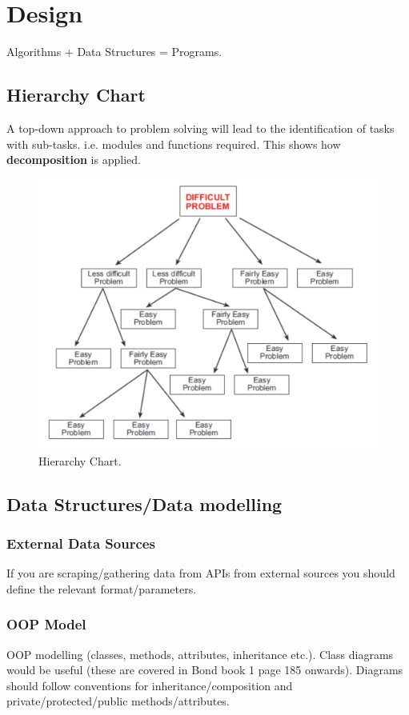 \documentclass{article}
\begin{document}
\section{Design}
Algorithms + Data Structures = Programs.

\subsection{Hierarchy Chart}
A top-down approach to problem solving will lead to the identification of tasks with sub-tasks. i.e. modules and functions required. This shows how \textbf{decomposition} is applied.

\begin{figure}[!ht]
    \centering
    \includegraphics[width = 0.5\linewidth]{hierarchy_chart.png}
    \caption{Hierarchy Chart.}
    \label{fig:hierarchy}
\end{figure}

\subsection{Data Structures/Data modelling}
\subsubsection{External Data Sources}
If you are scraping/gathering data from APIs from external sources you should define the relevant format/parameters.

\subsubsection{OOP Model}
OOP modelling (classes, methods, attributes, inheritance etc.). Class diagrams would be useful (these are covered in Bond book 1 page 185 onwards). Diagrams should follow conventions for inheritance/composition and private/protected/public methods/attributes.
\end{document}
